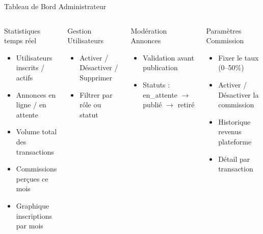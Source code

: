 ﻿\documentclass[aspectratio=169,10pt]{beamer}
\begin{document}
\begin{frame}{Tableau de Bord Administrateur}
\begin{columns}[T]
\begin{block}{Statistiques temps r\'{e}el}
\begin{itemize}
\item Utilisateurs inscrits / actifs
\item Annonces en ligne / en attente
\item Volume total des transactions
\item Commissions per\c{c}ues ce mois
\item Graphique inscriptions par mois
\end{itemize}
\end{block}
\vspace{0.2cm}
\begin{block}{Gestion Utilisateurs}
\begin{itemize}
\item Activer / D\'{e}sactiver / Supprimer
\item Filtrer par r\^{o}le ou statut
\end{itemize}
\end{block}
\begin{block}{Mod\'{e}ration Annonces}
\begin{itemize}
\item Validation avant publication
\item Statuts : en\_attente $\rightarrow$ publi\'{e} $\rightarrow$ retir\'{e}
\end{itemize}
\end{block}
\vspace{0.2cm}
\begin{alertblock}{Param\`{e}tres Commission}
\begin{itemize}
\item Fixer le taux (0--50\%)
\item Activer / D\'{e}sactiver la commission
\item Historique revenus plateforme
\item D\'{e}tail par transaction
\end{itemize}
\end{alertblock}
\end{columns}
\end{frame}
\end{document}
